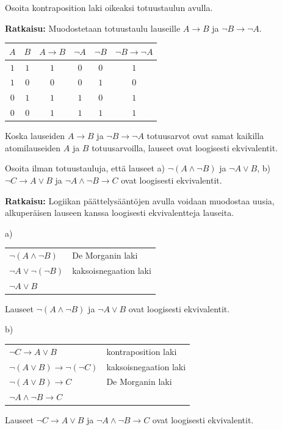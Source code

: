 \begin{esimerkki}
Osoita kontraposition laki oikeaksi totuustaulun avulla.

{\bf Ratkaisu:} 
Muodostetaan totuustaulu lauseille  $A\to B$  ja  $\lnot B \to \lnot A$.

\bigskip

\begin{center}

\begin{tabular}{|c|c|c|c|c|c|}\hline
$A$ & $B$ &  $A\to B$ & $\lnot A$  & $\lnot B$ & $\lnot B \to \lnot A$ \\ \hline
$1$ & $1$ & $1$ & $0$ & $0$ & $1$\\ 
$1$ & $0$ & $0$ & $0$ & $1$ & $0$\\
$0$ & $1$ & $1$ & $1$ & $0$ & $1$\\
$0$ & $0$ & $1$ & $1$ & $1$ & $1$\\ \hline
\end{tabular}

\end{center}

\bigskip

Koska lauseiden $A\to B$ ja $\lnot B \to \lnot A$ totuusarvot ovat samat kaikilla atomilauseiden $A$ ja $B$ totuusarvoilla, lauseet ovat loogisesti ekvivalentit.
\end{esimerkki}


\begin{esimerkki}
Osoita ilman totuustauluja, että lauseet  a) $\lnot(A \land \lnot B)$  ja  $\lnot A \lor B$,    b)  
$\lnot C\to A \lor B$ ja $\lnot A \land \lnot B \to C$ ovat loogisesti ekvivalentit.

{\bf Ratkaisu:}
Logiikan päättelysääntöjen avulla voidaan muodostaa uusia, alkuperäisen lauseen kanssa loogisesti ekvivalentteja lauseita.

a)

\begin{tabular}{ll}
$\lnot (A \land \lnot B)$ & De Morganin laki \\
$\lnot A \lor \lnot (\lnot B)$ & kaksoisnegaation laki \\
$\lnot A \lor B$ & \\
\end{tabular}

\bigskip

Lauseet $\lnot(A \land \lnot B)$  ja  $\lnot A \lor B$ ovat loogisesti ekvivalentit.

b)

\begin{tabular}{ll}
$\lnot C \to A \lor B$ & kontraposition laki \\
$\lnot (A\lor B)\to \lnot(\lnot C)$ & kaksoisnegaation laki \\
$\lnot (A \lor B) \to C$ & De Morganin laki\\
$\lnot A \land \lnot B \to C$
\end{tabular}

\bigskip

Lauseet $\lnot C\to A \lor B$ ja $\lnot A \land \lnot B \to C$ ovat loogisesti ekvivalentit.

\end{esimerkki}

